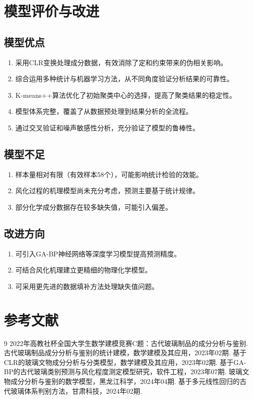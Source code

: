 \documentclass{cumcmthesis}
\begin{document}
\section{模型评价与改进}

\subsection{模型优点}
\begin{enumerate}
    \item 采用CLR变换处理成分数据，有效消除了定和约束带来的伪相关影响。
    \item 综合运用多种统计与机器学习方法，从不同角度验证分析结果的可靠性。
    \item K-means++算法优化了初始聚类中心的选择，提高了聚类结果的稳定性。
    \item 模型体系完整，覆盖了从数据预处理到结果分析的全流程。
    \item 通过交叉验证和噪声敏感性分析，充分验证了模型的鲁棒性。
\end{enumerate}

\subsection{模型不足}
\begin{enumerate}
    \item 样本量相对有限（有效样本58个），可能影响统计检验的效能。
    \item 风化过程的机理模型尚未充分考虑，预测主要基于统计规律。
    \item 部分化学成分数据存在较多缺失值，可能引入偏差。
\end{enumerate}

\subsection{改进方向}
\begin{enumerate}
    \item 可引入GA-BP神经网络等深度学习模型提高预测精度。
    \item 可结合风化机理建立更精细的物理化学模型。
    \item 可采用更先进的数据填补方法处理缺失值问题。
\end{enumerate}

\section{参考文献}

\begin{thebibliography}{9}
     2022年高教社杯全国大学生数学建模竞赛C题：古代玻璃制品的成分分析与鉴别.
     古代玻璃制品成分分析与鉴别的统计建模，数学建模及其应用，2023年02期.
     基于CLR的玻璃文物成分分析与分类模型，数学建模及其应用，2023年02期.
     基于GA-BP的古代玻璃类别预测与风化程度测定模型研究，软件工程，2023年07期.
     玻璃文物成分分析与鉴别的数学模型，黑龙江科学，2024年04期.
     基于多元线性回归的古代玻璃体系判别方法，甘肃科技，2024年02期.
\end{thebibliography}
\end{document}
